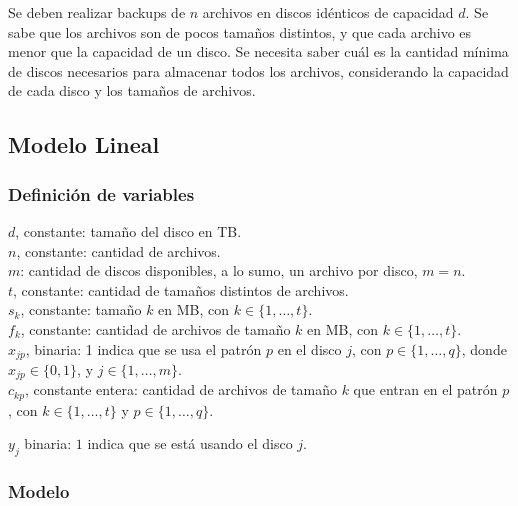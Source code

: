 \documentclass[11pt, a4paper, pdftex]{article}
\begin{document}
Se deben realizar backups de $n$ archivos en discos idénticos de
capacidad $d$. Se sabe que los archivos son de pocos tamaños distintos,
y que cada archivo es menor que la capacidad de un disco. Se necesita
saber cuál es la cantidad mínima de discos necesarios para almacenar
todos los archivos, considerando la capacidad de cada disco y los
tamaños de archivos.

\subsection{Modelo Lineal}

\subsubsection{Definición de variables}

\noindent $d$, constante: tamaño del disco en TB. \\

\noindent $n$, constante: cantidad de archivos. \\

\noindent $m$: cantidad de discos disponibles, a lo sumo, un archivo por disco, $m = n$. \\

\noindent $t$, constante: cantidad de tamaños distintos de archivos. \\

\noindent $s_{k}$, constante: tamaño $k$ en MB, con $k \in \{1, \ldots, t\}$. \\

\noindent $f_{k}$, constante: cantidad de archivos de tamaño $k$ en MB, con $k \in \{1, \ldots, t\}$. \\

\noindent $x_{jp}$, binaria: 1 indica que se usa el patrón $p$ en el disco $j$, con $p \in \{1, \ldots, q\}$, donde $x_{jp} \in \{0, 1\}$, y $j \in \{1, \ldots, m\}$. \\

\noindent $c_{kp}$, constante entera: cantidad de archivos de tamaño $k$ que entran en el patrón $p$, con $k \in \{1, \ldots, t\}$ y $p \in \{1, \ldots, q\}$.

\noindent $y_{j}$ binaria: $1$ indica que se está usando el disco $j$.

\subsubsection{Modelo}
\end{document}
